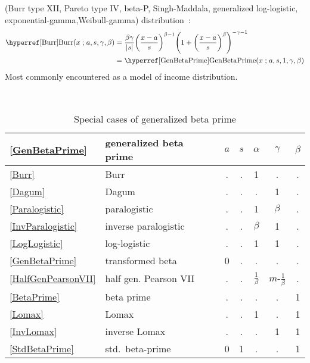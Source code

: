   (Burr type XII, Pareto type IV, beta-P, Singh-Maddala, generalized log-logistic, exponential-gamma,Weibull-gamma) 
distribution~\cite{Burr1942,Tadikamalla1980, Kleiber2003}:
\begin{align}
\label{Burr}
\opr{Burr}(x\given a, s, \gamma,\beta) 
&=  
 \frac{\beta \gamma}{|s|} \Left(\frac{x-a}{s}\Right)^{\beta-1}  \Left(1+\Left(\frac{x-a}{s}\Right)^\beta\Right)^{-\gamma-1} 
 \checked
\\ & = \opr{GenBetaPrime}(x\given a, s, 1,\gamma,\beta) \notag   \checked
\end{align}
Most commonly encountered as a model of income distribution.



\begin{table*}[tp]
\begin{center}
\caption[Generalized beta prime distribution -- Special cases]{Special cases of generalized beta prime}
\label{GenBetaPrimeTable}
~\\
{\renewcommand{\arraystretch}{1.25} 
\begin{tabular}{llccccc}
\eqref{GenBetaPrime}  & generalized beta prime & $a$ & $s$ & $\alpha$  &  $\gamma$ & ${\beta}$  \\
\hline
\eqref{Burr} & Burr 	        			&  .  &  .  &  1  &  .    &    .     \\
\eqref{Dagum} & Dagum			&  .  &  . &  .  &  1   &    .     \\
\eqref{Paralogistic} & paralogistic			&  . &  .  &  1  &  $\beta$    &    .     \\
\eqref{InvParalogistic} & inverse paralogistic	&  . &  .  &   $\beta$& 1    &    .     \\
\eqref{LogLogistic} & log-logistic			&  .  &  . &  1  &  1  &    .     \\
\eqref{GenBetaPrime} & transformed beta			&  0  &  . &  .  &  .  &    .     \\
\eqref{HalfGenPearsonVII} & half gen. Pearson VII 		&  .  &  . &  $\tfrac{1}{\beta}$  &  $m$-$\tfrac{1}{\beta}$  &    .     \\
\eqref{BetaPrime} & beta prime		& . & . & . & . & 1  \\
\eqref{Lomax} & Lomax 				&  .  &  . &  1  &  .   &    1     \\
\eqref{InvLomax} & inverse Lomax 				&  .  &  . &  .  &  1   &    1     \\
\eqref{StdBetaPrime} & std.~beta-prime		& 0 & 1 & . & . & 1  \\

\end{tabular}}
\end{center}
\end{table*}
